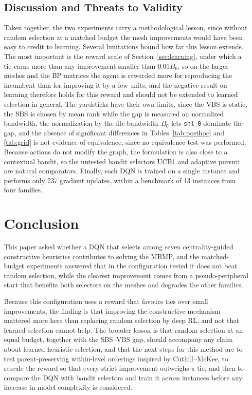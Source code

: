 \documentclass[runningheads]{llncs}
\begin{document}
\subsection{Discussion and Threats to Validity}
\label{sec:discussion}

Taken together, the two experiments carry a methodological lesson, since without random selection at a matched budget the mesh improvements would have been easy to credit to learning. Several limitations bound how far this lesson extends. The most important is the reward scale of Section~\ref{sec:learning}, under which a tie earns more than any improvement smaller than $0.01B_0$, so on the larger meshes and the BP matrices the agent is rewarded more for reproducing the incumbent than for improving it by a few units, and the negative result on learning therefore holds for this reward and should not be extended to learned selection in general. The yardsticks have their own limits, since the VBS is static, the SBS is chosen by mean rank while the gap is measured on normalized bandwidth, the normalization by the file bandwidth $B_0$ lets \texttt{shl\_0} dominate the gap, and the absence of significant differences in Tables~\ref{tab:posthoc} and \ref{tab:grid} is not evidence of equivalence, since no equivalence test was performed. Because actions do not modify the graph, the formulation is also close to a contextual bandit, so the untested bandit selectors UCB1 \cite{auer2002} and adaptive pursuit \cite{fialho2010} are natural comparators. Finally, each DQN is trained on a single instance and performs only 237 gradient updates, within a benchmark of 13 instances from four families.

\section{Conclusion}
\label{sec:conclusion}

This paper asked whether a DQN that selects among seven centrality-guided constructive heuristics contributes to solving the MBMP, and the matched-budget experiments answered that in the configuration tested it does not beat random selection, while the clearest improvement comes from a pseudo-peripheral start that benefits both selectors on the meshes and degrades the other families.

Because this configuration uses a reward that favours ties over small improvements, the finding is that improving the constructive mechanism mattered more here than replacing random selection by deep RL, and not that learned selection cannot help. The broader lesson is that random selection at an equal budget, together with the SBS--VBS gap, should accompany any claim about learned heuristic selection, and that the next steps for this method are to test parent-preserving within-level orderings inspired by Cuthill--McKee, to rescale the reward so that every strict improvement outweighs a tie, and then to compare the DQN with bandit selectors and train it across instances before any increase in model complexity is considered.
\end{document}

